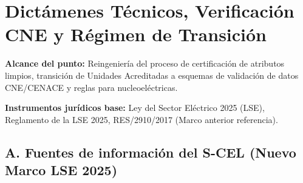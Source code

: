 \documentclass{cel}
\begin{document}
\section*{Dictámenes Técnicos, Verificación CNE y Régimen de Transición}
\nopagebreak

\textbf{Alcance del punto:} Reingeniería del proceso de certificación de atributos limpios, transición de Unidades Acreditadas a esquemas de validación de datos CNE/CENACE y reglas para nucleoeléctricas.

\textbf{Instrumentos jurídicos base:} Ley del Sector Eléctrico 2025 (LSE), Reglamento de la LSE 2025, RES/2910/2017 (Marco anterior referencia).


\vspace{0.4cm}
\subsection{A. Fuentes de información del S-CEL (Nuevo Marco LSE 2025)}
\nopagebreak
\end{document}
